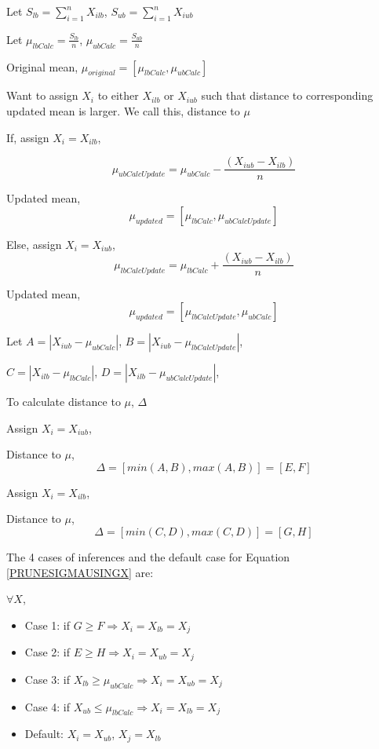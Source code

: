 \documentclass[a4paper,12pt]{article}
\begin{document}
Let $S_{lb} = \sum\limits_{i=1}^n X_{ilb}$, $S_{ub} = \sum\limits_{i=1}^n X_{iub}$

Let $\mu_{lbCalc} = \frac{S_{lb}}{n}$, $\mu_{ubCalc} = \frac{S_{ub}}{n}$ 

Original mean, $\mu_{original} = [\mu_{lbCalc}, \mu_{ubCalc}]$

Want to assign $X_{i}$ to either $X_{ilb}$ or $X_{iub}$ 
such that distance to corresponding updated mean is larger. We call this, 
distance to $\mu$

If, assign $X_{i} = X_{ilb}$, 

$$\mu_{ubCalcUpdate} =  \mu_{ubCalc} - \frac{(X_{iub} - X_{ilb})}{n}$$

Updated mean,  $$\mu_{updated} = [\mu_{lbCalc}, \mu_{ubCalcUpdate}]$$

Else, assign $X_{i} = X_{iub}$,
$$\mu_{lbCalcUpdate} =  \mu_{lbCalc} + \frac{(X_{iub} - X_{ilb})}{n}$$

Updated mean,  $$\mu_{updated} = [\mu_{lbCalcUpdate}, \mu_{ubCalc}]$$

Let $A = |X_{iub} - \mu_{ubCalc}|$, 
$B = |X_{iub} - \mu_{lbCalcUpdate}|$, 

$C = |X_{ilb} - \mu_{lbCalc}|$, 
$D = |X_{ilb} - \mu_{ubCalcUpdate}|$, 

To calculate distance to $\mu$, $\Delta$

Assign $X_{i} = X_{iub}$,

Distance to $\mu$, $$\Delta = [min(A, B), max(A, B)] = [E,F]$$

Assign $X_{i} = X_{ilb}$, 

Distance to $\mu$, $$\Delta = [min(C, D), max(C, D)] = [G,H]$$

The 4 cases of inferences and the default case for Equation \ref{PRUNESIGMAUSINGX} are: 

$\forall X$,
\begin{itemize}
\item Case 1: if $G \geq F \Rightarrow X_{i} = X_{lb} = X_{j}$
\item Case 2: if $E \geq H \Rightarrow X_{i} = X_{ub} = X_{j}$
\item Case 3: if $X_{lb} \geq \mu_{ubCalc} \Rightarrow X_{i} = X_{ub} = X_{j}$
\item Case 4: if $X_{ub} \leq \mu_{lbCalc} \Rightarrow X_{i} = X_{lb} = X_{j}$ 
\item Default: $X_{i} = X_{ub}$, $X_{j} = X_{lb}$
\end{itemize}
\end{document}
